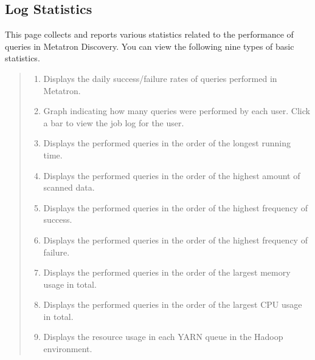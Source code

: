 \documentclass[letterpaper,10pt,english]{sphinxmanual}
\begin{document}
\subsection{Log Statistics}
\label{\detokenize{discovery/part02/data_monitoring:id2}}
This page collects and reports various statistics related to the performance of queries in Metatron Discovery. You can view the following nine types of basic statistics.
\begin{quote}

\begin{figure}[H]
\centering

\noindent{}
\end{figure}
\begin{enumerate}
\def\theenumi{\arabic{enumi}}
\def\labelenumi{\theenumi .}
\makeatletter\def\p@enumii{\p@enumi \theenumi .}\makeatother
\item {} 
 Displays the daily success/failure rates of queries performed in Metatron.

\item {} 
 Graph indicating how many queries were performed by each user. Click a bar to view the job log for the user.

\item {} 
 Displays the performed queries in the order of the longest running time.

\item {} 
 Displays the performed queries in the order of the highest amount of scanned data.

\item {} 
 Displays the performed queries in the order of the highest frequency of success.

\item {} 
 Displays the performed queries in the order of the highest frequency of failure.

\item {} 
 Displays the performed queries in the order of the largest memory usage in total.

\item {} 
 Displays the performed queries in the order of the largest CPU usage in total.

\item {} 
 Displays the resource usage in each YARN queue in the Hadoop environment.

\end{enumerate}
\end{quote}
\end{document}
